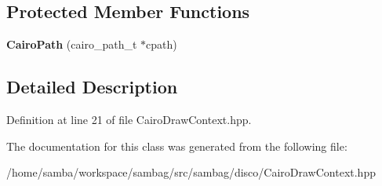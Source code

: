\subsection*{Protected Member Functions}
\begin{DoxyCompactItemize}
\item 
\hypertarget{classsambag_1_1disco_1_1_cairo_path_abfd8a25835341546ae24717e8eef30f3}{
{\bfseries CairoPath} (cairo\_\-path\_\-t $\ast$cpath)}
\label{classsambag_1_1disco_1_1_cairo_path_abfd8a25835341546ae24717e8eef30f3}

\end{DoxyCompactItemize}


\subsection{Detailed Description}


Definition at line 21 of file CairoDrawContext.hpp.



The documentation for this class was generated from the following file:\begin{DoxyCompactItemize}
\item 
/home/samba/workspace/sambag/src/sambag/disco/CairoDrawContext.hpp\end{DoxyCompactItemize}
